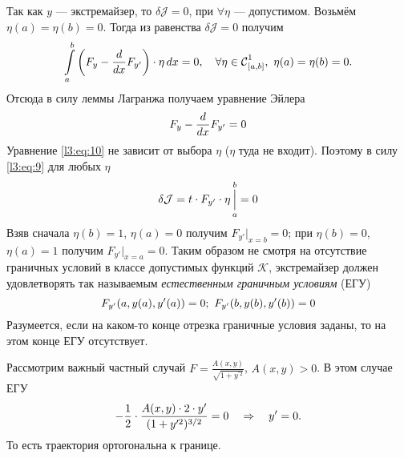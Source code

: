 \documentclass[12pt,a4paper,openany,fleqn]{book}
\newcommand{\Cf}{\ensuremath{\mathcal{C}}}
\newcommand{\J}{\ensuremath{\mathcal{J}}}
\newcommand{\mc}[1]{\ensuremath{\mathcal{#1}}}
\newcommand{\Cfn}[2][]{\ensuremath{\Cf{\mathstrut}^{#2}_{#1}}}
\newcommand{\der}[2]{\ensuremath{\frac{d#1}{d#2}}}
\newcommand{\K}{\mc{K}}
\theoremstyle{definition}
\begin{document}
Так как $y$ --- экстремайзер, то $\delta\J=0$, при $\forall\eta$ --- допустимом. Возьмём $\eta(a)=\eta(b)=0$. Тогда из равенства $\delta\J=0$ получим 
\begin{equation*}
	\hfill\int\limits_a^b\left(F_y-\der{}{x}F_{y'}\right)\cdot\eta\,dx=0,\quad \forall\eta\in\Cfn[{[a,b]}]{1},\ \eta(a)=\eta(b)=0.\hfill
\end{equation*}
Отсюда в силу леммы Лагранжа получаем уравнение Эйлера
\begin{equation}
	\label{l3:eq:10}
	\hfill F_{y}-\der{}{x}F_{y'}=0\hfill
\end{equation}
Уравнение \eqref{l3:eq:10} не зависит от выбора $\eta$ ($\eta$  туда не входит). Поэтому в силу \eqref{l3:eq:9} для любых $\eta$
\begin{equation*}
	\hfill\delta\J=t\cdot F_{y'}\cdot\eta\mathop{\Big|}\limits_a^b=0\hfill
\end{equation*}
Взяв сначала $\eta(b)=1$, $\eta(a)=0$ получим $F_{y'}\big|_{x=b}=0$; при $\eta(b)=0$, $\eta(a)=1$ получим $F_{y'}\big|_{x=a}=0$. Таким образом не смотря на отсутствие граничных условий в классе допустимых функций \K, экстремайзер должен удовлетворять так называемым \emph{естественным граничным условиям} (ЕГУ)
\vspace{-0.4cm}
\begin{equation}
	\label{l3:eq:11}
	\hfill F_{y'}(a,y(a),y'(a))=0;\ F_{y'}(b,y(b),y'(b))=0\hfill
\end{equation}  
Разумеется, если на каком-то конце отрезка граничные условия заданы, то на этом конце ЕГУ отсутствует.

Рассмотрим важный частный случай $F=\displaystyle\frac{A(x,y)}{\sqrt{1+y^{\prime 2}}}$, $A(x,y)>0$. В этом случае ЕГУ
\begin{equation*}
	\hfill-\frac12\cdot\frac{A(x,y)\cdot2\cdot y'}{(1+y^{\prime2})^{3/2}}=0\quad\Rightarrow\quad y'=0.\hfill
\end{equation*} 
То есть траектория ортогональна к границе.
\end{document}

